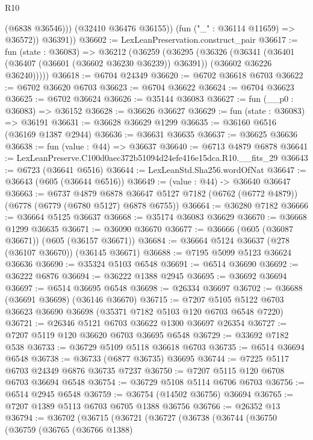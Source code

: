 \begin{lexlean}{R10}
\begin{coremodule}
                (@6838 @36546)))
            (@32410 @36476 @36155))
          (fun ("_" : @36114 @11659) => @36572))
        @36391))
@36602 := LexLeanPreservation.construct_pair
@36617 := fun (state : @36083) =>
  @36212
    (@36259
      (@36295
        (@36326
          (@36341
            (@36401 (@36407 (@36601 (@36602 @36230 @36239)) @36391))
            (@36602 @36226 @36240)))))
@36618 := @6704 @24349
@36620 := @6702 @36618 @6703
@36622 := @6702 @36620 @6703
@36623 := @6704 @36622
@36624 := @6704 @36623
@36625 := @6702 @36624
@36626 := @35144 @36083
@36627 := fun (__p0 : @36083) => @36152
@36628 := @36626 @36627
@36629 := fun (state : @36083) => @36191
@36631 := @36628 @36629 @1299
@36635 := @36160 @6516 (@36169 @1387 @2944)
@36636 := @36631 @36635
@36637 := @36625 @36636
@36638 := fun (value : @44) => @36637
@36640 := @6713 @4879 @6878
@36641 := LexLeanPreserve.C100d0aec372b51094d24efe416e15dca.R10.__fits_29
@36643 := @6723 (@36641 @6516)
@36644 := LexLeanStd.Sha256.wordOfNat
@36647 := @36643 (@605 (@36644 @6516))
@36649 := (value : @44) -> @36640 @36647
@36663 := @6737
    @4879
    @6878
    @36647
    @5127
    @7182
    (@6762 (@6772 @4879))
    (@6778 (@6779 (@6780 @5127) @6878 @6755))
@36664 := @36280 @7182
@36666 := @36664 @5125 @36637
@36668 := @35174 @36083 @36629
@36670 := @36668 @1299 @36635
@36671 := @36090 @36670
@36677 := @36666 (@605 (@36087 @36671)) (@605 (@36157 @36671))
@36684 := @36664 @5124 @36637 (@278 (@36107 @36670)) (@36145 @36671)
@36688 := @7195 @5099 @5123 @36624 @36636
@36690 := @35324 @5103 @6548
@36691 := @6514 @36690
@36692 := @36222 @6876
@36694 := @36222 @1388 @2945
@36695 := @36692 @36694
@36697 := @6514 @36695 @6548
@36698 := @26334 @36697
@36702 := @36688 (@36691 @36698) (@36146 @36670)
@36715 := @7207 @5105 @5122 @6703 @36623 @36690 @36698 (@35371 @7182 @5103 @120 @6703 @6548 @7220)
@36721 := @26346 @5121 @6703 @36622 @1300 @36697 @26354
@36727 := @7207 @5119 @120 @36620 @6703 @36695 @6548
@36729 := @33692 @7182 @538
@36733 := @36729 @5109 @5118 @36618 @6703
@36735 := @6514 @36694 @6548
@36738 := @36733 (@6877 @36735) @36695
@36744 := @7225 @5117 @6703 @24349 @6876 @36735 @7237
@36750 := @7207 @5115 @120 @6708 @6703 @36694 @6548
@36754 := @36729 @5108 @5114 @6706 @6703
@36756 := @6514 @2945 @6548
@36759 := @36754 (@14502 @36756) @36694
@36765 := @7207 @1389 @5113 @6703 @6705 @1388 @36756
@36766 := @26352 @13
@36794 := @36702
    (@36715
      (@36721
        (@36727
          (@36738
            (@36744
              (@36750
                (@36759
                  (@36765
                    (@36766 @1388)

\end{coremodule}
\end{lexlean}
